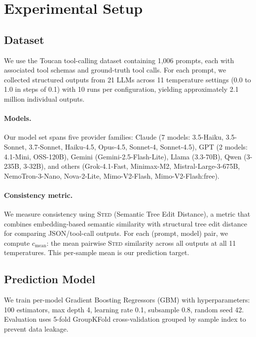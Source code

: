 \documentclass{article}
\newcommand{\cmean}{$c_\text{mean}$}
\newcommand{\sted}{\textsc{Sted}}
\begin{document}
\section{Experimental Setup}
\label{sec:setup}

\subsection{Dataset}

We use the Toucan tool-calling dataset \citep{toucan2024} containing 1,006 prompts, each with associated tool schemas and ground-truth tool calls. For each prompt, we collected structured outputs from 21 LLMs across 11 temperature settings (0.0 to 1.0 in steps of 0.1) with 10 runs per configuration, yielding approximately 2.1 million individual outputs.

\paragraph{Models.}
Our model set spans five provider families: Claude (7 models: 3.5-Haiku, 3.5-Sonnet, 3.7-Sonnet, Haiku-4.5, Opus-4.5, Sonnet-4, Sonnet-4.5), GPT (2 models: 4.1-Mini, OSS-120B), Gemini (Gemini-2.5-Flash-Lite), Llama (3.3-70B), Qwen (3-235B, 3-32B), and others (Grok-4.1-Fast, Minimax-M2, Mistral-Large-3-675B, NemoTron-3-Nano, Nova-2-Lite, Mimo-V2-Flash, Mimo-V2-Flash:free).

\paragraph{Consistency metric.}
We measure consistency using \sted{} (Semantic Tree Edit Distance), a metric that combines embedding-based semantic similarity with structural tree edit distance for comparing JSON/tool-call outputs. For each (prompt, model) pair, we compute \cmean{}: the mean pairwise \sted{} similarity across all outputs at all 11 temperatures. This per-sample mean is our prediction target.

\subsection{Prediction Model}

We train per-model Gradient Boosting Regressors (GBM) with hyperparameters: 100 estimators, max depth 4, learning rate 0.1, subsample 0.8, random seed 42. Evaluation uses 5-fold GroupKFold cross-validation grouped by sample index to prevent data leakage.
\end{document}
